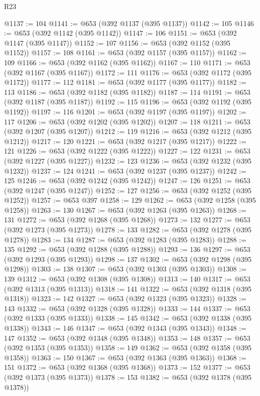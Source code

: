 \begin{lexlean}{R23}
\begin{coremodule}
@1137 := 104
@1141 := @653 (@392 @1137 (@395 @1137))
@1142 := 105
@1146 := @653 (@392 @1142 (@395 @1142))
@1147 := 106
@1151 := @653 (@392 @1147 (@395 @1147))
@1152 := 107
@1156 := @653 (@392 @1152 (@395 @1152))
@1157 := 108
@1161 := @653 (@392 @1157 (@395 @1157))
@1162 := 109
@1166 := @653 (@392 @1162 (@395 @1162))
@1167 := 110
@1171 := @653 (@392 @1167 (@395 @1167))
@1172 := 111
@1176 := @653 (@392 @1172 (@395 @1172))
@1177 := 112
@1181 := @653 (@392 @1177 (@395 @1177))
@1182 := 113
@1186 := @653 (@392 @1182 (@395 @1182))
@1187 := 114
@1191 := @653 (@392 @1187 (@395 @1187))
@1192 := 115
@1196 := @653 (@392 @1192 (@395 @1192))
@1197 := 116
@1201 := @653 (@392 @1197 (@395 @1197))
@1202 := 117
@1206 := @653 (@392 @1202 (@395 @1202))
@1207 := 118
@1211 := @653 (@392 @1207 (@395 @1207))
@1212 := 119
@1216 := @653 (@392 @1212 (@395 @1212))
@1217 := 120
@1221 := @653 (@392 @1217 (@395 @1217))
@1222 := 121
@1226 := @653 (@392 @1222 (@395 @1222))
@1227 := 122
@1231 := @653 (@392 @1227 (@395 @1227))
@1232 := 123
@1236 := @653 (@392 @1232 (@395 @1232))
@1237 := 124
@1241 := @653 (@392 @1237 (@395 @1237))
@1242 := 125
@1246 := @653 (@392 @1242 (@395 @1242))
@1247 := 126
@1251 := @653 (@392 @1247 (@395 @1247))
@1252 := 127
@1256 := @653 (@392 @1252 (@395 @1252))
@1257 := @653 @397
@1258 := 129
@1262 := @653 (@392 @1258 (@395 @1258))
@1263 := 130
@1267 := @653 (@392 @1263 (@395 @1263))
@1268 := 131
@1272 := @653 (@392 @1268 (@395 @1268))
@1273 := 132
@1277 := @653 (@392 @1273 (@395 @1273))
@1278 := 133
@1282 := @653 (@392 @1278 (@395 @1278))
@1283 := 134
@1287 := @653 (@392 @1283 (@395 @1283))
@1288 := 135
@1292 := @653 (@392 @1288 (@395 @1288))
@1293 := 136
@1297 := @653 (@392 @1293 (@395 @1293))
@1298 := 137
@1302 := @653 (@392 @1298 (@395 @1298))
@1303 := 138
@1307 := @653 (@392 @1303 (@395 @1303))
@1308 := 139
@1312 := @653 (@392 @1308 (@395 @1308))
@1313 := 140
@1317 := @653 (@392 @1313 (@395 @1313))
@1318 := 141
@1322 := @653 (@392 @1318 (@395 @1318))
@1323 := 142
@1327 := @653 (@392 @1323 (@395 @1323))
@1328 := 143
@1332 := @653 (@392 @1328 (@395 @1328))
@1333 := 144
@1337 := @653 (@392 @1333 (@395 @1333))
@1338 := 145
@1342 := @653 (@392 @1338 (@395 @1338))
@1343 := 146
@1347 := @653 (@392 @1343 (@395 @1343))
@1348 := 147
@1352 := @653 (@392 @1348 (@395 @1348))
@1353 := 148
@1357 := @653 (@392 @1353 (@395 @1353))
@1358 := 149
@1362 := @653 (@392 @1358 (@395 @1358))
@1363 := 150
@1367 := @653 (@392 @1363 (@395 @1363))
@1368 := 151
@1372 := @653 (@392 @1368 (@395 @1368))
@1373 := 152
@1377 := @653 (@392 @1373 (@395 @1373))
@1378 := 153
@1382 := @653 (@392 @1378 (@395 @1378))

\end{coremodule}
\end{lexlean}
